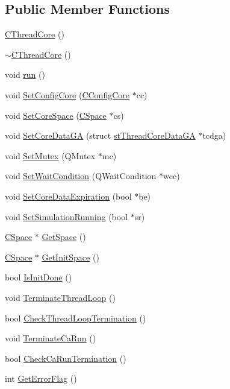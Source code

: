 \subsection*{Public Member Functions}
\begin{DoxyCompactItemize}
\item 
\hyperlink{classCThreadCore_a3bf4b7a3b3dab03741d538e35dcfb9dc}{CThreadCore} ()
\item 
\hyperlink{classCThreadCore_a059d1d66522f2e611d83abafda575564}{$\sim$CThreadCore} ()
\item 
void \hyperlink{classCThreadCore_af78150953eef0f33cf28125f137d7fbb}{run} ()
\item 
void \hyperlink{classCThreadCore_adfbf9fecc93acfb6f000f4d936a0f136}{SetConfigCore} (\hyperlink{classCConfigCore}{CConfigCore} $\ast$cc)
\item 
void \hyperlink{classCThreadCore_aebf817096243757f85c09221b9271c8d}{SetCoreSpace} (\hyperlink{classCSpace}{CSpace} $\ast$cs)
\item 
void \hyperlink{classCThreadCore_a21b99b77c6e6f2ba8c3616c82185d6ef}{SetCoreDataGA} (struct \hyperlink{structstThreadCoreDataGA}{stThreadCoreDataGA} $\ast$tcdga)
\item 
void \hyperlink{classCThreadCore_ada7f488e5307d5996cea904f5fa9d62b}{SetMutex} (QMutex $\ast$mc)
\item 
void \hyperlink{classCThreadCore_a68d67f8c9b9cb9592c014f3c8c27c5d7}{SetWaitCondition} (QWaitCondition $\ast$wcc)
\item 
void \hyperlink{classCThreadCore_a12e9d20ea581f945c72e6648a313e3b3}{SetCoreDataExpiration} (bool $\ast$be)
\item 
void \hyperlink{classCThreadCore_a001ae8aefae184bcb4274793a7633df6}{SetSimulationRunning} (bool $\ast$sr)
\item 
\hyperlink{classCSpace}{CSpace} $\ast$ \hyperlink{classCThreadCore_ae65e6c5c661c97f58d795907da19377a}{GetSpace} ()
\item 
\hyperlink{classCSpace}{CSpace} $\ast$ \hyperlink{classCThreadCore_aab198fc60402f7c65e5085404d9b75ae}{GetInitSpace} ()
\item 
bool \hyperlink{classCThreadCore_a85b03fa847d72661b2710af2beaa70dd}{IsInitDone} ()
\item 
void \hyperlink{classCThreadCore_a656208f8a0c3915d6786e317ba59184f}{TerminateThreadLoop} ()
\item 
bool \hyperlink{classCThreadCore_a817d1a465e68edcb480a30d66ec7f5c2}{CheckThreadLoopTermination} ()
\item 
void \hyperlink{classCThreadCore_ad44d9a6277ac3c02715b35eb44110c07}{TerminateCaRun} ()
\item 
bool \hyperlink{classCThreadCore_ac19af4cab9673daf796044312634c97a}{CheckCaRunTermination} ()
\item 
int \hyperlink{classCThreadCore_a584f4b6a6afec6903ca7cb5f9eac96b2}{GetErrorFlag} ()
\end{DoxyCompactItemize}
